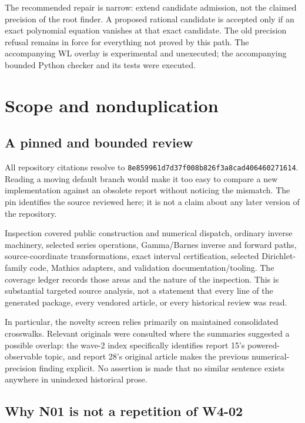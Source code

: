 \documentclass[11pt,letterpaper]{article}
\newcommand{\pin}{8e859961d7d37f008b826f3a8cad406460271614}
\begin{document}
The recommended repair is narrow: extend candidate admission, not the claimed precision of the root finder. A proposed rational candidate is accepted only if an exact polynomial equation vanishes at that exact candidate. The old precision refusal remains in force for everything not proved by this path. The accompanying WL overlay is experimental and unexecuted; the accompanying bounded Python checker and its tests were executed.

\section{Scope and nonduplication}
\subsection{A pinned and bounded review}

All repository citations resolve to \texttt{\pin}. Reading a moving default branch would make it too easy to compare a new implementation against an obsolete report without noticing the mismatch. The pin identifies the source reviewed here; it is not a claim about any later version of the repository.

Inspection covered public construction and numerical dispatch, ordinary inverse machinery, selected series operations, Gamma/Barnes inverse and forward paths, source-coordinate transformations, exact interval certification, selected Dirichlet-family code, Mathics adapters, and validation documentation/tooling. The coverage ledger records those areas and the nature of the inspection. This is substantial targeted source analysis, not a statement that every line of the generated package, every vendored article, or every historical review was read.

In particular, the novelty screen relies primarily on maintained consolidated crosswalks. Relevant originals were consulted where the summaries suggested a possible overlap: the wave-2 index specifically identifies report 15's powered-observable topic, and report 28's original article makes the previous numerical-precision finding explicit. No assertion is made that no similar sentence exists anywhere in unindexed historical prose.\cite{wave2-index,review28}

\subsection{Why N01 is not a repetition of W4-02}
\end{document}
